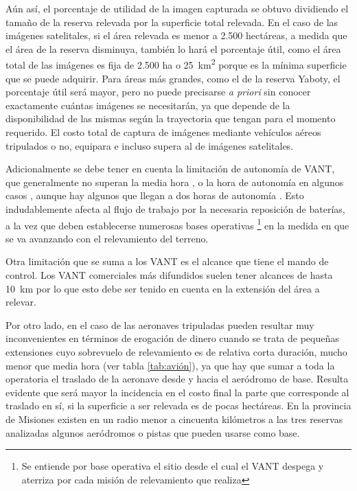 Aún así, el porcentaje de utilidad de la imagen capturada se obtuvo dividiendo el tamaño de la reserva relevada por la superficie total relevada. En el caso de las imágenes satelitales, si el área relevada es menor a 2.500 hectáreas, a medida que el área de la reserva disminuya, también lo hará el porcentaje útil, como el área total de las imágenes es fija de 2.500 ha o \SI{25}{\kilo\metre\squared} porque es la mínima superficie que se puede adquirir. Para áreas más grandes, como el de la reserva Yaboty, el porcentaje útil será mayor, pero no puede precisarse \textit{a priori} sin conocer exactamente cuántas imágenes se necesitarán, ya que depende de la disponibilidad de las mismas según la trayectoria que tengan para el momento requerido. El costo total de captura de imágenes mediante vehículos aéreos tripulados o no, equipara e incluso supera al de imágenes satelitales. 

Adicionalmente se debe tener en cuenta la limitación de autonomía de VANT, que generalmente no superan la media hora \cite{noauthor_dji_nodate}, o la hora de autonomía en algunos casos \cite{noauthor_specs_nodate}, aunque hay algunos que llegan a dos horas de autonomía \cite{noauthor_us-1_nodate}. Esto indudablemente afecta al flujo de trabajo por la necesaria reposición de baterías, a la vez que deben establecerse numerosas bases operativas \footnote{Se entiende por base operativa el sitio desde el cual el VANT despega y aterriza por cada misión de relevamiento que realiza} en la medida en que se va avanzando con el relevamiento del terreno.

Otra limitación que se suma a los VANT es el alcance que tiene el mando de control. Los VANT comerciales más difundidos suelen tener alcances de hasta \SI{10}{\kilo\metre} \cite{noauthor_dji_nodate} por lo que esto debe ser tenido en cuenta en la extensión del área a relevar.

Por otro lado, en el caso de las aeronaves tripuladas pueden resultar muy inconvenientes en términos de erogación de dinero cuando se trata de pequeñas extensiones cuyo sobrevuelo de relevamiento es de relativa corta duración, mucho menor que media hora (ver tabla \ref{tab:avión}), ya que hay que sumar a toda la operatoria el traslado de la aeronave desde y hacia el aeródromo de base. Resulta evidente que será mayor la incidencia en el costo final la parte que corresponde al traslado en sí, si la superficie a ser relevada es de pocas hectáreas. En la provincia de Misiones existen en un radio menor a cincuenta kilómetros a las tres reservas analizadas algunos aeródromos o pistas que pueden usarse como base.


